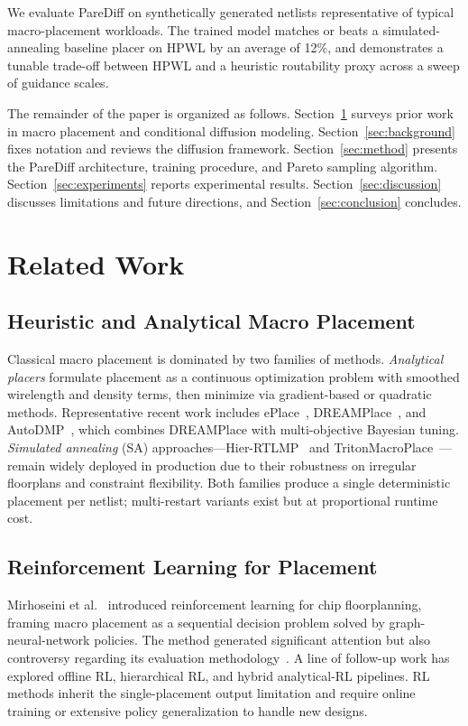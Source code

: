 \documentclass{ieeeaccess}
\begin{document}
We evaluate PareDiff on synthetically generated netlists representative of typical macro-placement workloads. The trained model matches or beats a simulated-annealing baseline placer on HPWL by an average of 12\%, and demonstrates a tunable trade-off between HPWL and a heuristic routability proxy across a sweep of guidance scales.

The remainder of the paper is organized as follows. Section~\ref{sec:related} surveys prior work in macro placement and conditional diffusion modeling. Section~\ref{sec:background} fixes notation and reviews the diffusion framework. Section~\ref{sec:method} presents the PareDiff architecture, training procedure, and Pareto sampling algorithm. Section~\ref{sec:experiments} reports experimental results. Section~\ref{sec:discussion} discusses limitations and future directions, and Section~\ref{sec:conclusion} concludes.

\section{Related Work}
\label{sec:related}

\subsection{Heuristic and Analytical Macro Placement}

Classical macro placement is dominated by two families of methods. \emph{Analytical placers} formulate placement as a continuous optimization problem with smoothed wirelength and density terms, then minimize via gradient-based or quadratic methods. Representative recent work includes ePlace~\cite{lu2015eplace}, DREAMPlace~\cite{lin2019dreamplace}, and AutoDMP~\cite{autodmp}, which combines DREAMPlace with multi-objective Bayesian tuning. \emph{Simulated annealing} (SA) approaches---Hier-RTLMP~\cite{hierrtlmp} and TritonMacroPlace~\cite{tritonmacroplace}---remain widely deployed in production due to their robustness on irregular floorplans and constraint flexibility. Both families produce a single deterministic placement per netlist; multi-restart variants exist but at proportional runtime cost.

\subsection{Reinforcement Learning for Placement}

Mirhoseini et al.~\cite{mirhoseini2021nature} introduced reinforcement learning for chip floorplanning, framing macro placement as a sequential decision problem solved by graph-neural-network policies. The method generated significant attention but also controversy regarding its evaluation methodology~\cite{cheng2024rethinking}. A line of follow-up work has explored offline RL, hierarchical RL, and hybrid analytical-RL pipelines. RL methods inherit the single-placement output limitation and require online training or extensive policy generalization to handle new designs.
\end{document}
